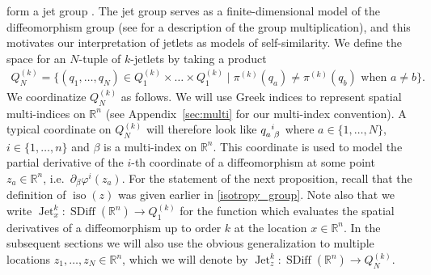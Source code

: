 \documentclass[12pt]{amsart}
\newcommand{\R}{\ensuremath{\mathbb{R}}}
\DeclareMathOperator{\SDiff}{SDiff}
\DeclareMathOperator{\Jet}{Jet}
\DeclareMathOperator{\iso}{iso}
\begin{document}
  form a jet group \cite{JacobsRatiuDesbrun2013}.
  The jet group serves as a finite-dimensional model of the diffeomorphism group (see \cite[Chapter 4]{KMS99} for a description of the group multiplication),
  and this motivates our interpretation of jetlets as models of self-similarity.
  We define the space for an $N$-tuple of $k$-jetlets by taking a product
  \begin{align*}
    Q^{(k)}_N = \{ (q_1,\dots, q_N) \in Q_1^{(k)} \times \dots \times Q_1^{(k)}
    \mid \pi^{(k)}(q_a) \neq \pi^{(k)}(q_b) \text{ when } a \neq b \}.
  \end{align*}
  We coordinatize $Q^{(k)}_N$ as follows.
  We will use Greek indices to represent spatial
  multi-indices on $\R^n$ (see Appendix~\ref{sec:multi} for our multi-index convention).
  A typical coordinate on $Q^{(k)}_N$ will therefore look
  like $q\indices{_a^i_\beta}$ where $a \in \{1,\dots,N\}$, $i \in \{ 1 , \dots, n \}$
  and $\beta$ is a multi-index on $\R^n$.
  This coordinate is used to model the partial derivative of the $i$-th coordinate
  of a diffeomorphism at some point $z_a \in \R^n$, i.e.\ $\partial_\beta \varphi^i(z_a)$.
  For the statement of the next proposition, recall that the definition  of $\iso(z)$ was given earlier in \eqref{isotropy_group}. Note also that we write $\Jet^k_x: \SDiff(\R^n) \to Q_1^{(k)}$ for
    the function which evaluates the spatial derivatives
    of a diffeomorphism up to order $k$ at the location $x \in \R^n$. In the subsequent sections we will also use the obvious generalization to multiple locations $z_1, \ldots, z_N \in \R^n$, which we will denote by $\Jet^k_z : \SDiff(\R^n) \to Q_N^{(k)}$.  
\end{document}
